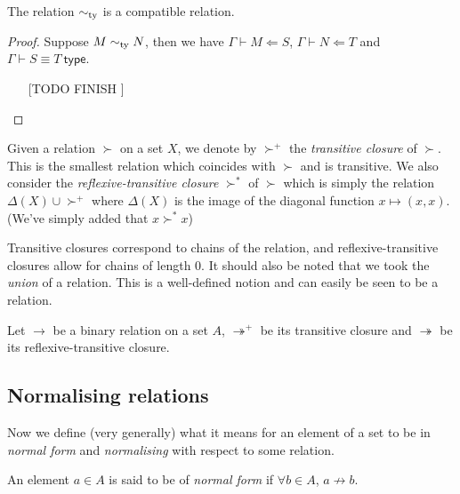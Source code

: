 \begin{lemma}
    The relation $\sim_{\mathrm{ty}}$ is a compatible relation.
\end{lemma}

\begin{proof}
    Suppose $M \sim_{\mathrm{ty}} N$, then we have $\Gamma \vdash M \Leftarrow S$, $\Gamma \vdash N \Leftarrow T$ and $\Gamma \vdash S \equiv T \ \mathsf{type}$.
    \begin{enumerate}
        \item [[TODO FINISH]]
    \end{enumerate}
\end{proof}

\begin{defin}
    Given a relation $\succ$ on a set $X$, we denote by $\succ^+$ the \emph{transitive closure} of $\succ$. This is the smallest relation which coincides with $\succ$ and is transitive. We also consider the \emph{reflexive-transitive closure} $\succ^*$ of $\succ$ which is simply the relation $\Delta(X)\cup \succ^+ $ where $\Delta(X)$ is the image of the diagonal function $x \mapsto (x,x)$. (We've simply added that $x \succ^* x$)
\end{defin}

\begin{remark}
    Transitive closures correspond to chains of the relation, and reflexive-transitive closures allow for chains of length $0$. It should also be noted that we took the \emph{union} of a relation. This is a well-defined notion and can easily be seen to be a relation.
\end{remark}

Let $\to$ be a binary relation on a set $A$, $\twoheadrightarrow^+$ be its transitive closure and $\twoheadrightarrow$ be its reflexive-transitive closure.

\subsection{Normalising relations}

Now we define (very generally) what it means for an element of a set to be in \emph{normal form} and \emph{normalising} with respect to some relation.

\begin{defin}
    An element $a \in A$ is said to be of \emph{normal form} if $\forall b \in A$, $a {\not \to} b$.
\end{defin}

